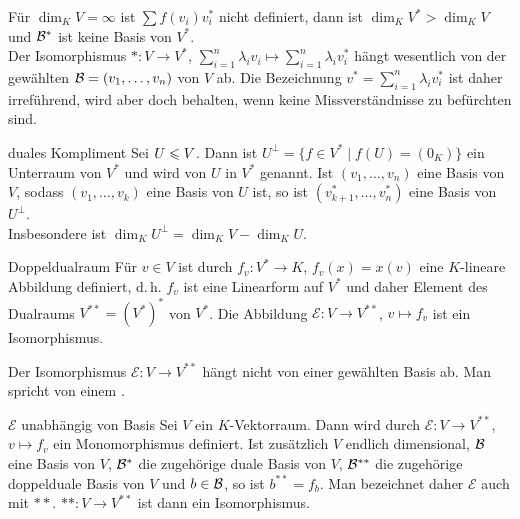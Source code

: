 \begin{Bem}
    Für $\dim_K V = \infty$ ist $\sum f(v_i) v_i^\ast$ nicht definiert,
    dann ist $\dim_K V^\ast > \dim_K V$ und $\mathcal{B}^\ast$ ist keine
    Basis von $V^\ast$. \\
    Der Isomorphismus $\ast: V \rightarrow V^\ast$,
    $\sum_{i=1}^n \lambda_i v_i \mapsto \sum_{i=1}^n \lambda_i v_i^\ast$
    hängt wesentlich von der gewählten $\mathcal{B} = (v_1, \ldots, v_n)$ von
    $V$ ab.
    Die Bezeichnung $v^\ast = \sum_{i=1}^n \lambda_i v_i^\ast$ ist daher
    irreführend, wird aber doch behalten, wenn keine Missverständnisse zu
    befürchten sind.
\end{Bem}

\begin{Def}{duales Kompliment}
    Sei $U \leqslant V$.
    Dann ist $U^\bot = \{f \in V^\ast \;|\; f(U) = (0_K)\}$ ein
    Unterraum von $V^\ast$ und wird  von $U$
    in $V^\ast$ genannt.
    Ist $(v_1, \ldots, v_n)$ eine Basis von $V$, sodass $(v_1, \ldots, v_k)$
    eine Basis von $U$ ist, so ist $(v_{k+1}^\ast, \ldots, v_n^\ast)$ eine
    Basis von $U^\bot$. \\
    Insbesondere ist $\dim_K U^\bot = \dim_K V - \dim_K U$.
\end{Def}

\begin{Satz}{Doppeldualraum}
    Für $v \in V$ ist durch $f_v: V^\ast \rightarrow K$, $f_v(x) = x(v)$
    eine $K$-lineare Abbildung definiert, d.\,h. $f_v$ ist eine Linearform
    auf $V^\ast$ und daher Element des Dualraums $V^{\ast\ast} = (V^\ast)^\ast$
    von $V^\ast$.
    Die Abbildung $\mathcal{E}: V \rightarrow V^{\ast\ast}$, $v \mapsto f_v$
    ist ein Isomorphismus.
\end{Satz}

\begin{Bem}
    Der Isomorphismus $\mathcal{E}: V \rightarrow V^{\ast\ast}$ hängt nicht
    von einer gewählten Basis ab.
    Man spricht von einem .
\end{Bem}

\begin{Satz}{$\mathcal{E}$ unabhängig von Basis}
    Sei $V$ ein $K$-Vektorraum.
    Dann wird durch $\mathcal{E}: V \rightarrow V^{\ast\ast}$, $v \mapsto f_v$
    ein Monomorphismus definiert.
    Ist zusätzlich $V$ endlich dimensional,
    $\mathcal{B}$ eine Basis von $V$,
    $\mathcal{B}^\ast$ die zugehörige duale Basis von $V$,
    $\mathcal{B}^{\ast\ast}$ die zugehörige doppelduale Basis von $V$
    und $b \in \mathcal{B}$, so ist $b^{\ast\ast} = f_b$.
    Man bezeichnet daher $\mathcal{E}$ auch mit $\ast\ast$.
    $\ast\ast: V \rightarrow V^{\ast\ast}$ ist dann ein Isomorphismus.
\end{Satz}


